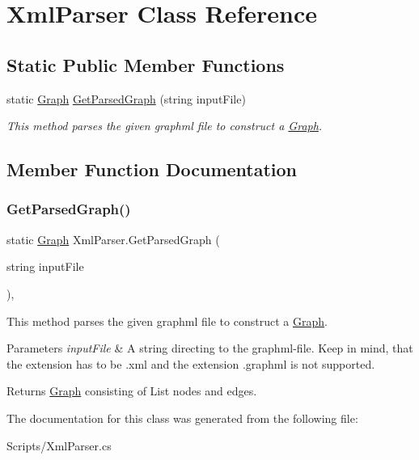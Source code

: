 \hypertarget{class_xml_parser}{}\section{Xml\+Parser Class Reference}
\label{class_xml_parser}
\subsection*{Static Public Member Functions}
\begin{DoxyCompactItemize}
\item 
static \mbox{\hyperlink{class_graph}{Graph}} \mbox{\hyperlink{class_xml_parser_ae8f169d407e7e3fbe866fdff38dc47c1}{Get\+Parsed\+Graph}} (string input\+File)
\begin{DoxyCompactList}\small\item\em This method parses the given graphml file to construct a \mbox{\hyperlink{class_graph}{Graph}}. \end{DoxyCompactList}\end{DoxyCompactItemize}


\subsection{Member Function Documentation}
\mbox{\label{class_xml_parser_ae8f169d407e7e3fbe866fdff38dc47c1}} 
\subsubsection{\texorpdfstring{GetParsedGraph()}{GetParsedGraph()}}
{\footnotesize\ttfamily static \mbox{\hyperlink{class_graph}{Graph}} Xml\+Parser.\+Get\+Parsed\+Graph (\begin{DoxyParamCaption}\item[{string}]{input\+File }\end{DoxyParamCaption})\hspace{0.3cm}{\ttfamily [inline]}, {\ttfamily [static]}}



This method parses the given graphml file to construct a \mbox{\hyperlink{class_graph}{Graph}}. 


\begin{DoxyParams}{Parameters}
{\em input\+File} & A string directing to the graphml-\/file. Keep in mind, that the extension has to be .xml and the extension .graphml is not supported.\\
\hline
\end{DoxyParams}
\begin{DoxyReturn}{Returns}
\mbox{\hyperlink{class_graph}{Graph}} consisting of List nodes and edges.
\end{DoxyReturn}


The documentation for this class was generated from the following file\+:\begin{DoxyCompactItemize}
\item 
Scripts/Xml\+Parser.\+cs\end{DoxyCompactItemize}
